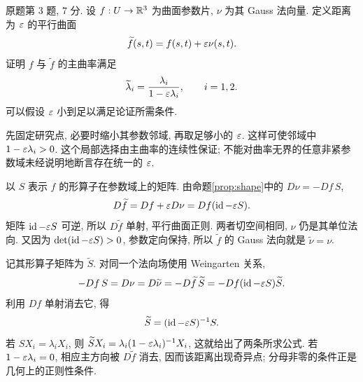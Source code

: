 \begin{exercise}\label{ps:5-3}
原题第 $3$ 题, $7$ 分. 设 $f:U\to\mathbb R^3$ 为曲面参数片, $\nu$ 为其 Gauss 法向量. 定义距离为 $\varepsilon$ 的平行曲面
\[
 \widetilde f(s,t)=f(s,t)+\varepsilon\nu(s,t).
\]
证明 $f$ 与 $\widetilde f$ 的主曲率满足
\[
 \widetilde\lambda_i=\frac{\lambda_i}{1-\varepsilon\lambda_i},\qquad i=1,2.
\]
可以假设 $\varepsilon$ 小到足以满足论证所需条件.
\end{exercise}
\begin{solution}
先固定研究点, 必要时缩小其参数邻域, 再取足够小的 $\varepsilon$. 这样可使邻域中 $1-\varepsilon\lambda_i>0$. 这个局部选择由主曲率的连续性保证; 不能对曲率无界的任意非紧参数域未经说明地断言存在统一的 $\varepsilon$.

以 $S$ 表示 $f$ 的形算子在参数域上的矩阵. 由命题\ref{prop:shape}中的 $D\nu=-Df\,S$,
\[
 D\widetilde f=Df+\varepsilon D\nu=Df(\operatorname{id}-\varepsilon S).
\]
矩阵 $\operatorname{id}-\varepsilon S$ 可逆, 所以 $D\widetilde f$ 单射, 平行曲面正则. 两者切空间相同, $\nu$ 仍是其单位法向. 又因为 $\det(\operatorname{id}-\varepsilon S)>0$, 参数定向保持, 所以 $\widetilde f$ 的 Gauss 法向就是 $\widetilde\nu=\nu$.

记其形算子矩阵为 $\widetilde S$. 对同一个法向场使用 Weingarten 关系,
\[
 -Df\,S=D\nu=D\widetilde\nu
 =-D\widetilde f\,\widetilde S
 =-Df(\operatorname{id}-\varepsilon S)\widetilde S.
\]
利用 $Df$ 单射消去它, 得
\[
 \widetilde S=(\operatorname{id}-\varepsilon S)^{-1}S.
\]
若 $SX_i=\lambda_iX_i$, 则 $\widetilde S X_i=\lambda_i(1-\varepsilon\lambda_i)^{-1}X_i$, 这就给出了两条所求公式. 若 $1-\varepsilon\lambda_i=0$, 相应主方向被 $D\widetilde f$ 消去, 因而该距离出现奇异点; 分母非零的条件正是几何上的正则性条件.
\end{solution}
